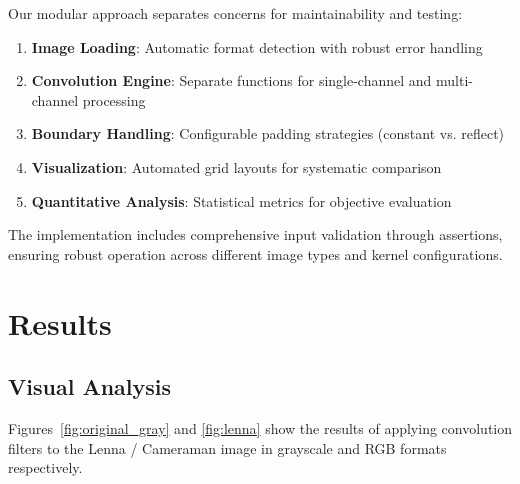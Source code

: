 \documentclass[12pt,a4paper]{article}
\begin{document}
	Our modular approach separates concerns for maintainability and testing:
	
	\begin{enumerate}
		\item \textbf{Image Loading}: Automatic format detection with robust error handling
		\item \textbf{Convolution Engine}: Separate functions for single-channel and multi-channel processing
		\item \textbf{Boundary Handling}: Configurable padding strategies (constant vs. reflect)
		\item \textbf{Visualization}: Automated grid layouts for systematic comparison
		\item \textbf{Quantitative Analysis}: Statistical metrics for objective evaluation
	\end{enumerate}
	
	The implementation includes comprehensive input validation through assertions, ensuring robust operation across different image types and kernel configurations.
	\newpage
	\section{Results}
	
	\subsection{Visual Analysis}
	Figures~\ref{fig:original_gray} and \ref{fig:lenna} show the results of applying convolution filters to the Lenna / Cameraman image in grayscale and RGB formats respectively.
	
\end{document}
